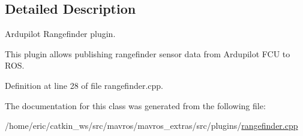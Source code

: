 \subsection{Detailed Description}
Ardupilot Rangefinder plugin. 

This plugin allows publishing rangefinder sensor data from Ardupilot F\+CU to R\+OS. 

Definition at line 28 of file rangefinder.\+cpp.



The documentation for this class was generated from the following file\+:\begin{DoxyCompactItemize}
\item 
/home/eric/catkin\+\_\+ws/src/mavros/mavros\+\_\+extras/src/plugins/\mbox{\hyperlink{rangefinder_8cpp}{rangefinder.\+cpp}}\end{DoxyCompactItemize}
